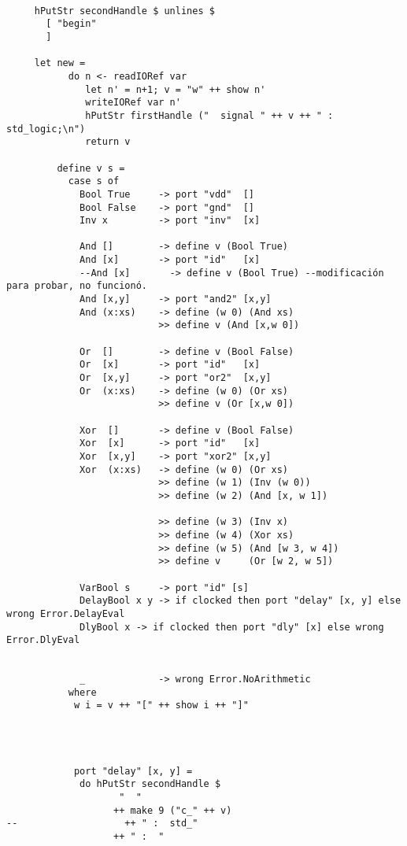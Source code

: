 \begin{lstlisting}
       
     hPutStr secondHandle $ unlines $
       [ "begin"
       ]
     
     let new =
           do n <- readIORef var	
              let n' = n+1; v = "w" ++ show n'
              writeIORef var n'
              hPutStr firstHandle ("  signal " ++ v ++ " : std_logic;\n")
              return v
         
         define v s =
           case s of
             Bool True     -> port "vdd"  []
             Bool False    -> port "gnd"  []
             Inv x         -> port "inv"  [x]

             And []        -> define v (Bool True)
             And [x]       -> port "id"   [x]
             --And [x]       -> define v (Bool True) --modificación para probar, no funcionó.
             And [x,y]     -> port "and2" [x,y]
             And (x:xs)    -> define (w 0) (And xs)
                           >> define v (And [x,w 0])

             Or  []        -> define v (Bool False)
             Or  [x]       -> port "id"   [x]
             Or  [x,y]     -> port "or2"  [x,y]
             Or  (x:xs)    -> define (w 0) (Or xs)
                           >> define v (Or [x,w 0])

             Xor  []       -> define v (Bool False)
             Xor  [x]      -> port "id"   [x]
             Xor  [x,y]    -> port "xor2" [x,y]
             Xor  (x:xs)   -> define (w 0) (Or xs)
                           >> define (w 1) (Inv (w 0))
                           >> define (w 2) (And [x, w 1])
                           
                           >> define (w 3) (Inv x)
                           >> define (w 4) (Xor xs)
                           >> define (w 5) (And [w 3, w 4])
                           >> define v     (Or [w 2, w 5])

             VarBool s     -> port "id" [s]
             DelayBool x y -> if clocked then port "delay" [x, y] else wrong Error.DelayEval
             DlyBool x -> if clocked then port "dly" [x] else wrong Error.DlyEval
             

             _             -> wrong Error.NoArithmetic
           where
            w i = v ++ "[" ++ show i ++ "]"
            


            
            port "delay" [x, y] =
             do hPutStr secondHandle $
                    "  "
                   ++ make 9 ("c_" ++ v)
--                   ++ " :  std_"
                   ++ " :  "


\end{lstlisting}

